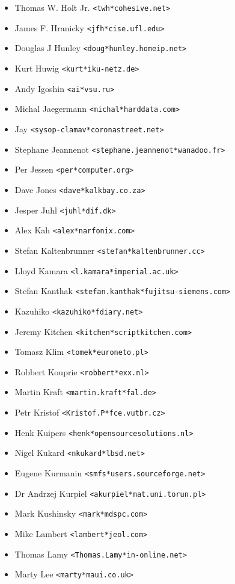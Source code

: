 \documentclass[a4paper,titlepage,12pt]{article}
\newcommand{\email}[1]{\texttt{#1}}
\begin{document}
\begin{itemize}
	\item Thomas W. Holt Jr. \email{<twh*cohesive.net>}
	\item James F.  Hranicky \email{<jfh*cise.ufl.edu>}
	\item Douglas J Hunley \email{<doug*hunley.homeip.net>}
	\item Kurt Huwig \email{<kurt*iku-netz.de>}
	\item Andy Igoshin \email{<ai*vsu.ru>}
	\item Michal Jaegermann \email{<michal*harddata.com>}
	\item Jay \email{<sysop-clamav*coronastreet.net>}
	\item Stephane Jeannenot \email{<stephane.jeannenot*wanadoo.fr>}
	\item Per Jessen \email{<per*computer.org>}
	\item Dave Jones \email{<dave*kalkbay.co.za>}
	\item Jesper Juhl \email{<juhl*dif.dk>}
	\item Alex Kah \email{<alex*narfonix.com>}
	\item Stefan Kaltenbrunner \email{<stefan*kaltenbrunner.cc>}
	\item Lloyd Kamara \email{<l.kamara*imperial.ac.uk>}
	\item Stefan Kanthak \email{<stefan.kanthak*fujitsu-siemens.com>}
	\item Kazuhiko \email{<kazuhiko*fdiary.net>}
	\item Jeremy Kitchen \email{<kitchen*scriptkitchen.com>}
	\item Tomasz Klim \email{<tomek*euroneto.pl>}
	\item Robbert Kouprie \email{<robbert*exx.nl>}
	\item Martin Kraft \email{<martin.kraft*fal.de>}
	\item Petr Kristof \email{<Kristof.P*fce.vutbr.cz>}
	\item Henk Kuipers \email{<henk*opensourcesolutions.nl>}
	\item Nigel Kukard \email{<nkukard*lbsd.net>}
	\item Eugene Kurmanin \email{<smfs*users.sourceforge.net>}
	\item Dr Andrzej Kurpiel \email{<akurpiel*mat.uni.torun.pl>}
	\item Mark Kushinsky \email{<mark*mdspc.com>}
	\item Mike Lambert \email{<lambert*jeol.com>}
	\item Thomas Lamy \email{<Thomas.Lamy*in-online.net>}
	\item Marty Lee \email{<marty*maui.co.uk>}

\end{itemize}
\end{document}
